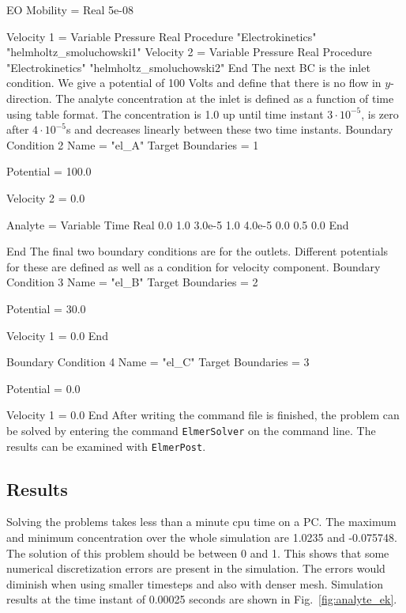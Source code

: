   EO Mobility = Real 5e-08 

  Velocity 1 = Variable Pressure
      Real Procedure  "Electrokinetics" "helmholtz_smoluchowski1"
  Velocity 2 = Variable Pressure
      Real Procedure  "Electrokinetics" "helmholtz_smoluchowski2"
End
\ttend
%
The next BC is the inlet condition. We give a potential of 100 Volts
and define that there is no flow in $y$-direction. The analyte
concentration at the inlet is defined as a function of time using
table format. The concentration is 1.0 up until time instant $3\cdot
10^{-5}$, is zero after $4\cdot 10^{-5}$s and decreases linearly
between these two time instants.
%
\ttbegin
Boundary Condition 2
  Name = "el_A"
  Target Boundaries = 1

  Potential = 100.0

  Velocity 2 = 0.0

  Analyte = Variable Time
    Real
      0.0      1.0
      3.0e-5   1.0
      4.0e-5   0.0
      0.5      0.0
    End

End
\ttend
% 
The final two boundary conditions are for the outlets. Different
potentials for these are defined as well as a condition for velocity
component.
%
\ttbegin
Boundary Condition 3
  Name = "el_B"
  Target Boundaries = 2

  Potential = 30.0

  Velocity 1 = 0.0
End

Boundary Condition 4
  Name = "el_C"
  Target Boundaries = 3

  Potential = 0.0 

  Velocity 1 = 0.0
End
\ttend
%
After writing the command file is finished, the problem can be solved
by entering the command \texttt{ElmerSolver} on the command line. The
results can be examined with \texttt{ElmerPost}.


\subsection*{Results}

Solving the problems takes less than a minute cpu time on a PC. The
maximum and minimum concentration over the whole simulation are 1.0235
and -0.075748. The solution of this problem should be between 0 and
1. This shows that some numerical discretization errors are present in
the simulation. The errors would diminish when using smaller timesteps
and also with denser mesh. Simulation results at the time
instant of 0.00025 seconds are shown in Fig.~\ref{fig:analyte_ek}.

